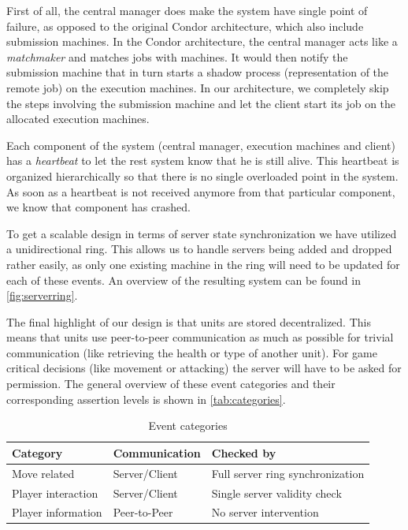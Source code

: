 \documentclass[a4paper,10pt]{article}
\begin{document}
First of all, the central manager does make the system have single point of failure,
as opposed to the original Condor architecture, which also include submission machines.
In the Condor architecture, the central manager acts like a \emph{matchmaker} and matches jobs with machines.
It would then notify the submission machine that in turn starts a shadow process (representation of the remote job) on the execution machines.
In our architecture, we completely skip the steps involving the submission machine and let the client start its job on the allocated execution machines.

Each component of the system (central manager, execution machines and client) has a \emph{heartbeat} to let the rest system know that he is still alive.
This heartbeat is organized hierarchically so that there is no single overloaded point in the system.
As soon as a heartbeat is not received anymore from that particular component, we know that component has crashed.

To get a scalable design in terms of server state synchronization we have utilized a unidirectional ring.
This allows us to handle servers being added and dropped rather easily, as only one existing machine in the ring
will need to be updated for each of these events. An overview of the resulting system can be found in \autoref{fig:serverring}.

The final highlight of our design is that units are stored decentralized.
This means that units use peer-to-peer communication as much as possible for trivial communication (like retrieving the health or type of another unit).
For game critical decisions (like movement or attacking) the server will have to be asked for permission.
The general overview of these event categories and their corresponding assertion levels is shown in \autoref{tab:categories}.

\begin{table}
\begin{tabular}{| l | l | l |}
\hline
\textbf{Category} & \textbf{Communication} & \textbf{Checked by} \\
\hline
\hline
Move related & Server/Client & Full server ring synchronization \\
\hline
Player interaction & Server/Client & Single server validity check \\
\hline
Player information & Peer-to-Peer & No server intervention \\
\hline
\end{tabular}
\caption{Event categories}
\label{tab:categories}
\end{table}
\end{document}
